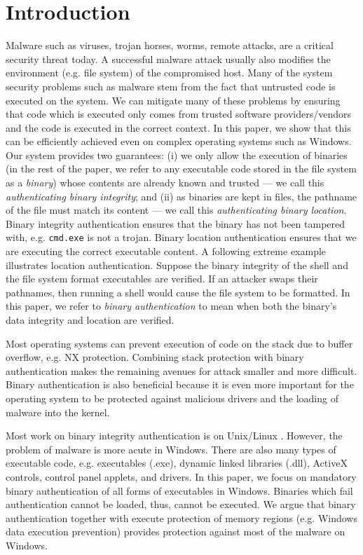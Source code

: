 \section{Introduction}
\label{sect:intro}

Malware such as viruses, trojan horses, worms, remote attacks, 
are a critical security threat today.
A successful malware attack usually also modifies
the environment (e.g. file system) of the compromised host.
Many of the system security problems such as malware stem from the fact that untrusted code is executed
on the system.
We can mitigate many of these problems by ensuring that code which is executed only comes
from trusted software providers/vendors and the code is executed in the correct context.
In this paper, we show that this can be efficiently achieved even on complex
operating systems such
as Windows. Our system provides two guarantees:
(i) we only allow the execution of binaries (in the rest of the paper, we refer
to any executable code stored in the file system as a {\em binary})
whose contents are already known and trusted --- we call this {\em authenticating binary integrity};
and (ii) as binaries are kept in files, the pathname of the file must 
match its content --- we call this {\em authenticating binary location}. 
Binary integrity authentication ensures that the binary has not been
tampered with, e.g. {\tt cmd.exe} is not a trojan.
Binary location authentication ensures that we are executing
the correct executable content. 
A following extreme example illustrates location authentication. 
Suppose the binary integrity of the shell and the file system format executables 
are verified. If an attacker swaps their pathnames,
then running a shell would cause the file system to be formatted.
In this paper, we refer to {\em binary authentication} to mean when 
both the binary's data integrity and location are verified.

Most operating systems can prevent execution of code
on the stack due to buffer overflow, e.g. NX protection.
Combining stack protection with binary authentication
makes the remaining avenues for attack 
smaller and more difficult.
Binary authentication is also beneficial because it is even more important
for the operating system to be protected against malicious drivers
and the loading of malware into the kernel.

Most work on binary integrity authentication is on Unix/Linux
\cite{digsig,williams,signedexec}.
However, the problem of malware is more acute in Windows.
There are also many types of executable code,
e.g. executables (.exe), dynamic linked libraries (.dll), 
ActiveX controls, control panel applets, and drivers. 
In this paper, we focus on mandatory binary authentication of all forms
of executables in Windows. 
Binaries which fail authentication cannot be loaded, thus,
cannot be executed. We argue that binary authentication together with 
execute protection of memory regions (e.g. Windows data execution prevention) 
provides protection against most of the malware on Windows.

